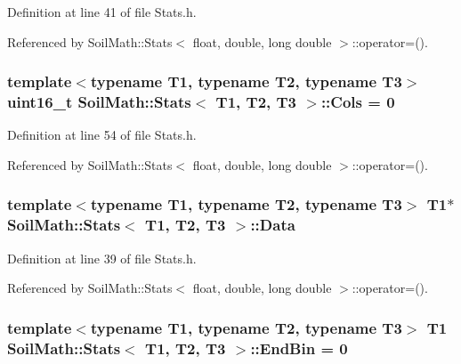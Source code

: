 Definition at line 41 of file Stats.\+h.



Referenced by Soil\+Math\+::\+Stats$<$ float, double, long double $>$\+::operator=().

\hypertarget{class_soil_math_1_1_stats_a971f1ec23c32137805c4577f05454d83}{}
\subsubsection[{Cols}]{\setlength{\rightskip}{0pt plus 5cm}template$<$typename T1, typename T2, typename T3$>$ uint16\+\_\+t {\bf Soil\+Math\+::\+Stats}$<$ T1, T2, T3 $>$\+::Cols = 0}\label{class_soil_math_1_1_stats_a971f1ec23c32137805c4577f05454d83}


Definition at line 54 of file Stats.\+h.



Referenced by Soil\+Math\+::\+Stats$<$ float, double, long double $>$\+::operator=().

\hypertarget{class_soil_math_1_1_stats_affce366ceab8419a3f732e3c3a358f65}{}
\subsubsection[{Data}]{\setlength{\rightskip}{0pt plus 5cm}template$<$typename T1, typename T2, typename T3$>$ T1$\ast$ {\bf Soil\+Math\+::\+Stats}$<$ T1, T2, T3 $>$\+::Data}\label{class_soil_math_1_1_stats_affce366ceab8419a3f732e3c3a358f65}


Definition at line 39 of file Stats.\+h.



Referenced by Soil\+Math\+::\+Stats$<$ float, double, long double $>$\+::operator=().

\hypertarget{class_soil_math_1_1_stats_a0db07157ff238d0d40c4e1f4d67afd46}{}
\subsubsection[{End\+Bin}]{\setlength{\rightskip}{0pt plus 5cm}template$<$typename T1, typename T2, typename T3$>$ T1 {\bf Soil\+Math\+::\+Stats}$<$ T1, T2, T3 $>$\+::End\+Bin = 0}\label{class_soil_math_1_1_stats_a0db07157ff238d0d40c4e1f4d67afd46}



